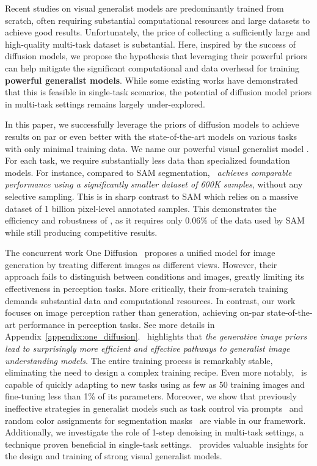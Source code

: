 Recent studies \cite{wang2023images, lu2022unified, lu2024unified, mizrahi20234m, bachmann20244m, xi2023dynamic} on visual generalist models are predominantly trained from scratch, often requiring substantial computational resources and large datasets to achieve good results. 
Unfortunately, 
the price 
of collecting a sufficiently large and high-quality multi-task dataset is substantial. 
Here, 
inspired by the success of diffusion models, we propose the hypothesis that leveraging their powerful priors 
can 
help mitigate the significant computational and data overhead for training \textbf{powerful
generalist models}. While some existing works \cite{ke2024repurposing, xu2024diffusion, he2024lotus, ye2024stablenormal, shao2024learning} have demonstrated 
that
this is feasible in single-task scenarios, the potential of diffusion model priors in multi-task settings remains largely under-explored.



In this paper, we successfully leverage the priors of diffusion models to achieve results on par or even better  with the state-of-the-art models on various tasks with only  minimal training data.
We name our powerful visual generalist model \oursbf.
For each task, we require substantially less data than specialized foundation models. 
For instance, compared to SAM segmentation, \textit{
\ours\  achieves comparable performance using a significantly smaller dataset of 600K samples}, without any selective sampling. This is in sharp contrast to SAM which relies on a massive dataset of 1 billion pixel-level annotated samples. This demonstrates the efficiency and robustness of \ours, as it requires only 0.06\% of the data used by SAM while still producing competitive results. 

The concurrent work One Diffusion~\cite{le2024diffusiongenerate} proposes a unified model for image generation by treating different images as different views. However, their approach fails to distinguish between conditions and images, greatly limiting its effectiveness in perception tasks. More critically, their from-scratch training demands substantial data and computational resources.
In contrast, our work focuses on image perception rather than generation, achieving on-par state-of-the-art performance in perception tasks.
See more details in Appendix~\ref{appendix:one_diffusion}.
\ours\  highlights that \textit{the generative 
image priors lead to surprisingly more efficient and effective 
pathways to 
generalist image understanding models.}
The entire training process is remarkably stable, eliminating the need to design a complex training recipe. Even more notably, \ours\ is capable of quickly adapting to new tasks using as few as 50 training images and fine-tuning less than 1\% of its parameters.
Moreover, we show that previously ineffective strategies in generalist models such as task control via prompts~\cite{xi2023dynamic} and random color assignments for segmentation masks~\cite{wang2023images} are viable in our framework. Additionally, we investigate the role of 1-step denoising in multi-task settings, a technique proven beneficial in single-task settings. \ours\ provides valuable insights for the 
design and training of strong
visual generalist models.

